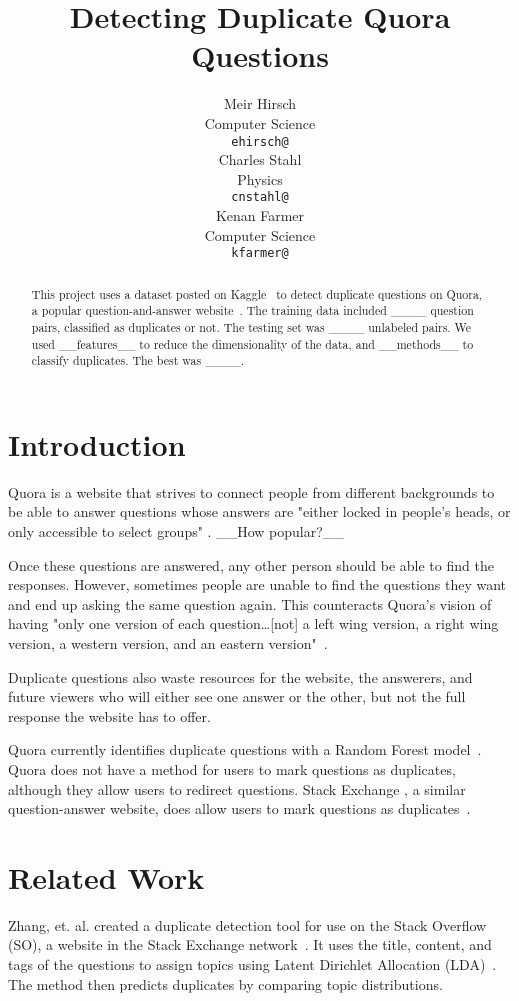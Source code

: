 \documentclass{article} %
\title{Detecting Duplicate Quora Questions}
\author{
Meir Hirsch \\
Computer Science\\
\texttt{ehirsch@} \\
\And
Charles Stahl \\
Physics \\
\texttt{cnstahl@} \\
\And
Kenan Farmer\\
Computer Science \\
\texttt{kfarmer@}\\
}
\begin{document}
\maketitle

\begin{abstract}
This project uses a dataset posted on Kaggle~\cite{kaggleComp} to detect duplicate questions on Quora, a popular question-and-answer website~\cite{quora}. The training data included \_\_\_\_ question pairs, classified as duplicates or not. The testing set was \_\_\_\_ unlabeled pairs. We used \_\_features\_\_ to reduce the dimensionality of the data, and \_\_methods\_\_ to classify duplicates. The best was \_\_\_\_.
\end{abstract}

\section{Introduction}

Quora is a website that strives to connect people from different backgrounds to be able to answer questions whose answers are "either locked in people’s heads, or only accessible to select groups" \cite{quora}. \_\_How popular?\_\_

Once these questions are answered, any other person should be able to find the responses. However, sometimes people are unable to find the questions they want and end up asking the same question again. This counteracts Quora's vision of having "only one version of each question\dots [not] a left wing version, a right wing version, a western version, and an eastern version"~\cite{quora}. 

Duplicate questions also waste resources for the website, the answerers, and future viewers who will either see one answer or the other, but not the full response the website has to offer.

Quora currently identifies duplicate questions with a Random Forest model~\cite{kaggleComp}. Quora does not have a method for users to mark questions as duplicates, although they allow users to redirect questions. Stack Exchange , a similar question-answer website, does allow users to mark questions as duplicates~\cite{stackdup}.



\section{Related Work}

Zhang, et. al. created a duplicate detection tool for use on the Stack Overflow (SO), a website in the Stack Exchange network~\cite{Zhang2015}. It uses the title, content, and tags of the questions to assign topics using Latent Dirichlet Allocation (LDA)~\cite{Blei03}. The method then predicts duplicates by comparing topic distributions.
\end{document}
